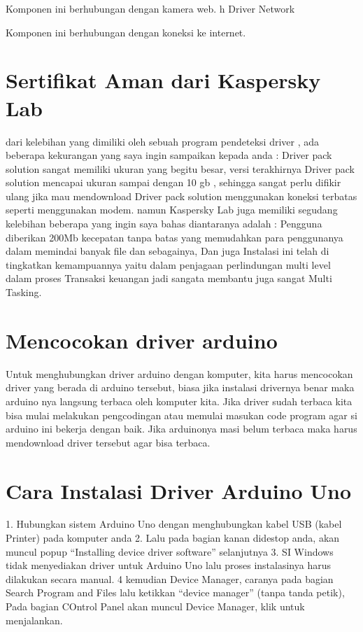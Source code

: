  Komponen ini berhubungan dengan kamera web.
h	Driver Network 

 Komponen ini berhubungan dengan koneksi ke internet.


\section{Sertifikat Aman dari Kaspersky Lab}
dari kelebihan yang dimiliki oleh sebuah program pendeteksi driver , ada beberapa kekurangan yang saya ingin sampaikan kepada anda  :
Driver pack solution sangat memiliki ukuran yang begitu besar,  versi terakhirnya Driver pack solution mencapai ukuran sampai dengan 10 gb , sehingga sangat perlu difikir ulang jika mau  mendownload Driver pack solution menggunakan koneksi terbatas seperti menggunakan modem.
namun Kaspersky Lab juga memiliki segudang kelebihan beberapa yang ingin saya bahas diantaranya adalah :
Pengguna diberikan 200Mb kecepatan tanpa batas yang memudahkan para penggunanya dalam memindai banyak file dan sebagainya, Dan juga Instalasi ini telah di tingkatkan kemampuannya yaitu dalam penjagaan perlindungan multi level dalam proses Transaksi keuangan jadi sangata membantu juga sangat Multi Tasking.

\section{Mencocokan driver arduino}
Untuk menghubungkan driver arduino dengan komputer, kita harus mencocokan driver yang berada di arduino tersebut, biasa jika instalasi drivernya benar maka arduino nya langsung terbaca oleh komputer kita. Jika driver sudah terbaca kita bisa mulai melakukan pengcodingan atau memulai masukan code program agar si arduino ini bekerja dengan baik. Jika arduinonya masi belum terbaca maka harus mendownload driver tersebut agar bisa terbaca.

\section {Cara Instalasi Driver Arduino Uno}
1. Hubungkan sistem  Arduino Uno dengan menghubungkan kabel USB (kabel Printer) pada komputer anda
2. Lalu pada bagian kanan didestop anda, akan muncul popup “Installing device driver software” selanjutnya
3. SI Windows tidak menyediakan driver untuk Arduino Uno lalu proses instalasinya harus dilakukan secara manual.
4 kemudian Device Manager, caranya pada bagian Search Program and Files lalu ketikkan “device manager” (tanpa tanda petik), Pada bagian COntrol Panel akan muncul Device Manager, klik untuk menjalankan.

